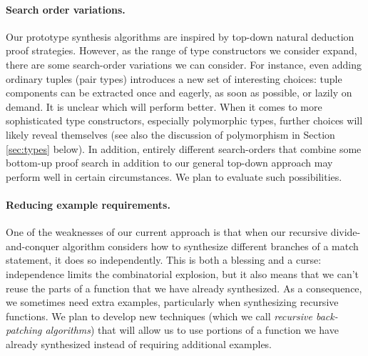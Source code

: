 \paragraph*{Search order variations.}
Our prototype synthesis algorithms are inspired by top-down natural
deduction proof strategies.  However, as the range of type constructors
we consider expand, there are some search-order variations we can consider.
For instance, even adding ordinary tuples (pair types) introduces a new
set of interesting choices:  tuple components can be extracted once and
eagerly, as soon as possible, or lazily on demand.  It is unclear which 
will perform better.  When it comes to more sophisticated type constructors,
especially polymorphic types, further choices will likely reveal 
themselves (see also the discussion of polymorphism in 
Section \ref{sec:types} below).
In addition, entirely different search-orders that combine some bottom-up proof search in addition to our general top-down approach may perform well
in certain circumstances.  We plan to evaluate such possibilities.

\paragraph*{Reducing example requirements.}
One of the weaknesses of our current approach is that when our recursive
divide-and-conquer algorithm considers how to synthesize different
branches of a match statement, it does so independently.  This is 
both a blessing and a curse: independence limits the combinatorial
explosion, but it also means that we can't reuse the parts of a function
that we have already synthesized.  As a consequence, we sometimes need 
extra examples, particularly when synthesizing recursive functions.
We plan to develop new techniques (which we call \emph{recursive back-patching
algorithms}) that will allow us to use portions of a function we have
already synthesized instead of requiring additional examples.

